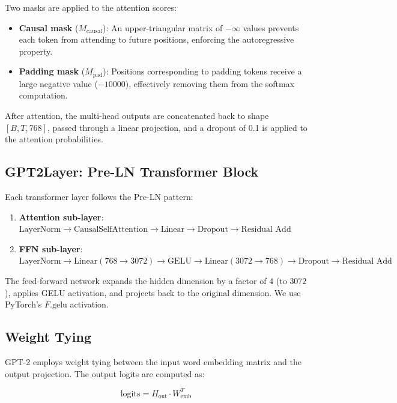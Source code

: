 \documentclass[11pt,a4paper]{article}
\begin{document}
Two masks are applied to the attention scores:
\begin{itemize}[nosep]
  \item \textbf{Causal mask} ($M_{\text{causal}}$): An upper-triangular matrix of $-\infty$ values prevents each token from attending to future positions, enforcing the autoregressive property.
  \item \textbf{Padding mask} ($M_{\text{pad}}$): Positions corresponding to padding tokens receive a large negative value ($-10000$), effectively removing them from the softmax computation.
\end{itemize}

After attention, the multi-head outputs are concatenated back to shape $[B, T, 768]$, passed through a linear projection, and a dropout of 0.1 is applied to the attention probabilities.

\subsection{GPT2Layer: Pre-LN Transformer Block}

Each transformer layer follows the Pre-LN pattern:

\begin{enumerate}[nosep]
  \item \textbf{Attention sub-layer}: $\text{LayerNorm} \rightarrow \text{CausalSelfAttention} \rightarrow \text{Linear} \rightarrow \text{Dropout} \rightarrow \text{Residual Add}$
  \item \textbf{FFN sub-layer}: $\text{LayerNorm} \rightarrow \text{Linear}(768 \rightarrow 3072) \rightarrow \text{GELU} \rightarrow \text{Linear}(3072 \rightarrow 768) \rightarrow \text{Dropout} \rightarrow \text{Residual Add}$
\end{enumerate}

The feed-forward network expands the hidden dimension by a factor of 4 (to $3072$), applies GELU activation, and projects back to the original dimension. We use PyTorch's $F.\mathrm{gelu}$ activation.

\subsection{Weight Tying}

GPT-2 employs weight tying between the input word embedding matrix and the output projection. The output logits are computed as:

\begin{equation}
\mathrm{logits} = H_{\text{out}} \cdot W_{\text{emb}}^T
\end{equation}
\end{document}
